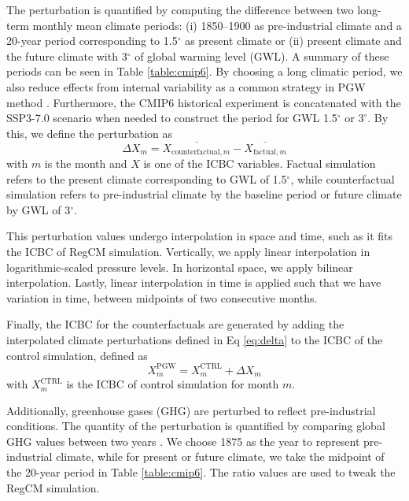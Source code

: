 The perturbation is quantified by computing the difference between two long-term monthly mean climate periods: (i) 1850--1900 as pre-industrial climate and a 20-year period corresponding to 1.5$^\circ$ as present climate or (ii) present climate and the future climate with 3$^\circ$ of global warming level (GWL). A summary of these periods can be seen in Table \ref{table:cmip6}. By choosing a long climatic period, we also reduce effects from internal variability as a common strategy in PGW method \citep{brogli2023pseudo}. Furthermore, the CMIP6 historical experiment is concatenated with the SSP3-7.0 scenario when needed to construct the period for GWL 1.5$^\circ$ or $3^\circ$. By this, we define the perturbation as
\begin{equation} \label{eq:delta}
    \Delta X_m = \overline{X_{\text{counterfactual}, m}} - \overline{X_{\text{factual}, m}}
\end{equation}
with $m$ is the month and $X$ is one of the ICBC variables. Factual simulation refers to the present climate corresponding to GWL of 1.5$^\circ$, while counterfactual simulation refers to pre-industrial climate by the baseline period or future climate by GWL of 3$^\circ$.

This perturbation values undergo interpolation in space and time, such as it fits the ICBC of RegCM simulation. Vertically, we apply linear interpolation in logarithmic-scaled pressure levels. In horizontal space, we apply bilinear interpolation. Lastly, linear interpolation in time is applied such that we have variation in time, between midpoints of two consecutive months.

Finally, the ICBC for the counterfactuals are generated by adding the interpolated climate perturbations defined in Eq \eqref{eq:delta} to the ICBC of the control simulation, defined as
\begin{equation}
    X^{\text{PGW}}_m = X^{\text{CTRL}}_m + \Delta X_m
\end{equation}
with $X^{\text{CTRL}}_m$ is the ICBC of control simulation for month $m$.

Additionally, greenhouse gases (GHG) are perturbed to reflect pre-industrial conditions. The quantity of the perturbation is quantified by comparing global GHG values between two years \citep{meinshausen2017historical, meinshausen2020ssp}. We choose 1875 as the year to represent pre-industrial climate, while for present or future climate, we take the midpoint of the 20-year period in Table \ref{table:cmip6}. The ratio values are used to tweak the RegCM simulation.


